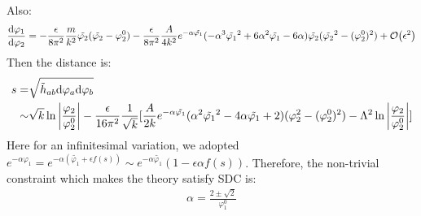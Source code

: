 Also:
\begin{align}
    \dv{\varphi_{1}}{\varphi_{2}} = -\frac{\epsilon}{8\pi^{2}}\frac{m}{k^{2}}\tilde{\varphi_{2}} (\tilde{\varphi_{2}} - \varphi_{2}^{0}) - \frac{\epsilon}{8\pi^{2}}\frac{A}{4k^{2}}e^{-\alpha\tilde{\varphi_{1}}}(-\alpha^{3} \tilde{\varphi_{1}}^{2} + 6\alpha^{2} \tilde{\varphi_{1}} - 6\alpha)\tilde{\varphi_{2}} (\tilde{\varphi_{2}}^{2} - (\varphi_{2}^{0})^{2}) + \order{\epsilon^{2}}
\end{align}
Then the distance is:
\begin{align}
    \begin{split}
        s =& \sqrt{\tilde{h}_{ab} \dd \varphi_{a} \dd \varphi_{b}} \\
        \sim & \sqrt{k} \ln \abs{\frac{\varphi_{2}}{\varphi_{2}^{0}}} -\frac{\epsilon}{16\pi^{2}}\frac{1}{\sqrt{k}}[ \frac{A}{2k}e^{-\alpha \tilde{\varphi_{1}}}(\alpha^{2}\tilde{\varphi_{1}}^{2} - 4\alpha\tilde{\varphi_{1}}+2) (\varphi_{2}^{2} - (\varphi_{2}^{0})^{2}) -\Lambda^{2} \ln \abs{\frac{\varphi_{2}}{\varphi_{2}^{0}}} ]
    \end{split}
\end{align}
Here for an infinitesimal variation, we adopted $e^{-\alpha \varphi_{1}} = e^{-\alpha(\tilde{\varphi_{1}} + \epsilon f(s))} \sim e^{-\alpha\tilde{\varphi_{1}}} (1 - \epsilon \alpha f(s))$.
Therefore, the non-trivial constraint which makes the theory satisfy SDC is:
\begin{align}
    \alpha = \frac{2\pm \sqrt{2}}{\varphi_{1}^{0}}
\end{align}